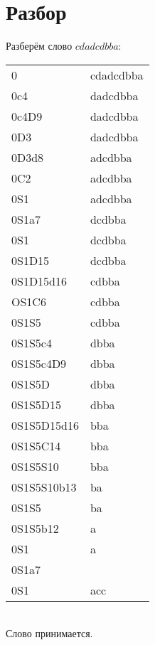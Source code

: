 \documentclass{article}
\begin{document}
    \section{Разбор}
    Разберём слово $cdadcdbba$:\\
    \begin{tabular}{l|l}
    0 & cdadcdbba \\
    0c4 & dadcdbba \\
    0c4D9 & dadcdbba \\
    0D3 & dadcdbba \\
    0D3d8 & adcdbba \\
    0C2 & adcdbba \\
    0S1 & adcdbba \\
    0S1a7 & dcdbba \\
    0S1 & dcdbba \\
    0S1D15 & dcdbba \\
    0S1D15d16 &  cdbba \\
    OS1C6 & cdbba \\
    0S1S5 & cdbba \\
    0S1S5c4 & dbba \\
    0S1S5c4D9 & dbba \\
    0S1S5D & dbba \\
    0S1S5D15 & dbba \\
    0S1S5D15d16 & bba \\
    0S1S5C14 & bba \\
    0S1S5S10 & bba \\
    0S1S5S10b13 & ba \\
    0S1S5 & ba \\
    0S1S5b12 & a \\
    0S1 & a \\
    0S1a7 & \\
    0S1 & acc\\
    \end{tabular}\\
    Слово принимается.
\end{document}
